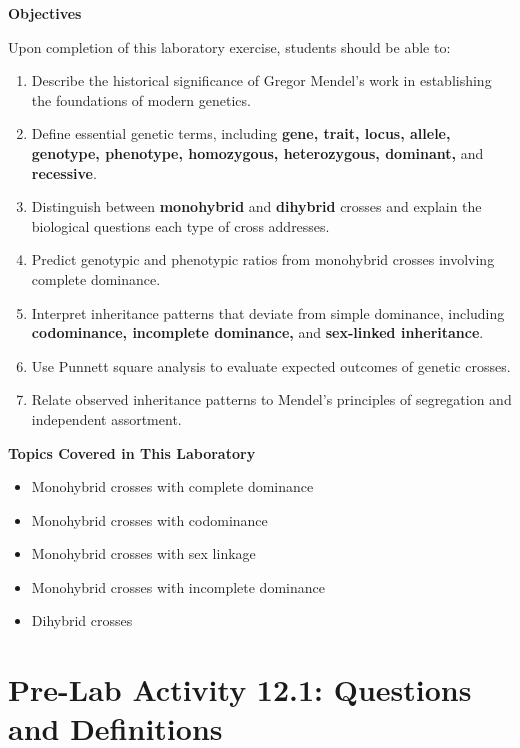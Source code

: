 \documentclass[
  letterpaper,
  DIV=11,
  numbers=noendperiod]{scrreprt}
\begin{document}
\textbf{Objectives}

Upon completion of this laboratory exercise, students should be able to:

\begin{enumerate}
\def\labelenumi{\arabic{enumi}.}
\item
  Describe the historical significance of Gregor Mendel's work in
  establishing the foundations of modern genetics.
\item
  Define essential genetic terms, including \textbf{gene, trait, locus,
  allele, genotype, phenotype, homozygous, heterozygous, dominant,} and
  \textbf{recessive}.
\item
  Distinguish between \textbf{monohybrid} and \textbf{dihybrid} crosses
  and explain the biological questions each type of cross addresses.
\item
  Predict genotypic and phenotypic ratios from monohybrid crosses
  involving complete dominance.
\item
  Interpret inheritance patterns that deviate from simple dominance,
  including \textbf{codominance, incomplete dominance,} and
  \textbf{sex-linked inheritance}.
\item
  Use Punnett square analysis to evaluate expected outcomes of genetic
  crosses.
\item
  Relate observed inheritance patterns to Mendel's principles of
  segregation and independent assortment.
\end{enumerate}

\textbf{Topics Covered in This Laboratory}

\begin{itemize}
\item
  Monohybrid crosses with complete dominance
\item
  Monohybrid crosses with codominance
\item
  Monohybrid crosses with sex linkage
\item
  Monohybrid crosses with incomplete dominance
\item
  Dihybrid crosses
\end{itemize}

\section{\texorpdfstring{\textbf{Pre-Lab Activity 12.1: Questions and
Definitions}}{Pre-Lab Activity 12.1: Questions and Definitions}}\label{pre-lab-activity-12.1-questions-and-definitions}
\end{document}
